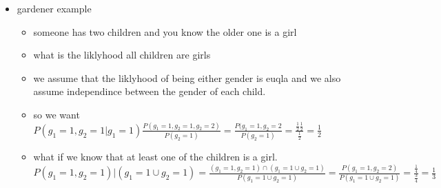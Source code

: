 \documentclass{article}
\begin{document}
\begin{itemize}
\begin{enumerate}
    \item the Monty hall problem. there are three doors, behind 1 is a prize call that door k. you pick a door call it door i, and the host shows you what is behind one of the other two doors call it door j. you you are given to switch and sellect a new door call it door l. and you want to know should you swtich. 
    \item think of it like this let w be win, switch be s, and f be first (which takes on value 1 if you pick correctly and 0 otherwise. here we can assume that switching and your first choice are indepdnint, this makes sense if that is your stat $P(w=1|s=0)=P(w=1,f=0|s=0)+P(w=1,f=1|s=0)=P(w=1|s=0,f=0)P(s=0|f=0)P(f=0)+P(w=1|s=0,f=1)P(s=0|f=1)P(f=1)=P(w=1|s=0,f=1)P(s=0|f=1)P(f=1)$ since clearly $P(w=1,f=1|s=0)=0$ if we chose wrong and did not switch  $P(w=1|s=0,f=1)P(s=0|f=1)P(f=1)=(1)(p)P(f=1)\frac{p}{3}$ where p is our liklyhood of switching 
    \item now consider $P(w=1|s=1)=P(w=1,f=0|s=1)+P(w=1,f=1|s=1)=P(w=1|f=0,s=1)P(s=1|f=0)P(f=0)+P(w=1|f=1,s=1)P(s=1|f=1)P(f=1)=P(w=1|f=0,s=1)P(s=1|f=0)P(f=0)$ since if we chose right and stich we never win $P(w=1|f=0,s=1)P(s=1|f=0)P(f=0)=(1)(p)\frac{2}{3}$
    \item $P(w=1|s=1)=\frac{2p}{3}$ and $P(w=1|s=0)=\frac{p}{3}$
    \item we can maximise this by setting p=1 that is by always switching in this case we have a 2/3 cahnce of wining. 
\end{enumerate}
\item gardener example 
\begin{itemize}
    \item someone has two children and you know the older one is a girl 
    \item what is the liklyhood all children are girls 
    \item we assume that the liklyhood of being either gender is euqla 
    \itme and we also assume independince between the gender of each child. 
    \item so we want $P(g_1=1,g_2=1|g_1=1)\frac{P(g_1=1,g_2=1,g_2=2)}{P(g_2=1)}=\frac{P(g_1=1,g_2=2}{P(g_2=1)}=\frac{\frac{1}{2}\frac{1}{2}}{\frac{1}{2}}=\frac{1}{2}$
    \item what if we know that at least one of the children is a girl. $P(g_1=1,g_2=1)|(g_1=1\cup g_2=1)=\frac{(g_1=1,g_2=1)\cap(g_1=1\cup g_2=1)}{P(g_1=1\cup g_2=1)}=\frac{P(g_1=1,g_2=2)}{P(g_1=1 \cup g_2=1)}=\frac{\frac{1}{4}}{\frac{3}{4}}=\frac{1}{3}$
\end{itemize}

\end{itemize}
\end{document}
